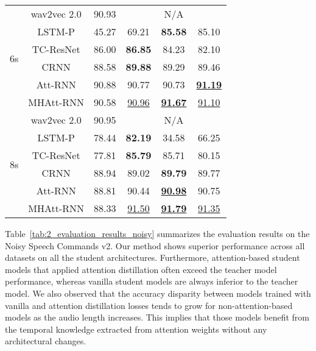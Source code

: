 \documentclass{article}
\begin{document}
\begin{table}[t]
\begin{tabular}{c|c|c|ccc}
\multirow{6}{*}{ 6s } & wav2vec 2.0 & 90.93 & \multicolumn{3}{c}{ N/A } \\
\cmidrule{2-6}
& LSTM-P & 45.27 & 69.21 & \textbf{ 85.58 } & 85.10 \\
& TC-ResNet & 86.00 & \textbf{ 86.85 } & 84.23 & 82.10 \\
& CRNN & 88.58 & \textbf{ 89.88 } & 89.29 & 89.46 \\
& Att-RNN & 90.88 & 90.77 & 90.73 & \textbf{ \underline{91.19} } \\
& MHAtt-RNN & 90.58 & \underline{90.96} & \textbf{ \underline{91.67} } & \underline{91.10} \\
\midrule

\multirow{6}{*}{ 8s } & wav2vec 2.0 & 90.95 & \multicolumn{3}{c}{ N/A } \\
\cmidrule{2-6}
& LSTM-P & 78.44 & \textbf{ 82.19 } & 34.58 & 66.25 \\
& TC-ResNet & 77.81 & \textbf{ 85.79 } & 85.71 & 80.15 \\
& CRNN & 88.94 & 89.02 & \textbf{ 89.79 } & 89.77 \\
& Att-RNN & 88.81 & 90.44 & \textbf{ \underline{90.98} } & 90.75 \\
& MHAtt-RNN & 88.33 & \underline{91.50} & \textbf{ \underline{91.79} } & \underline{91.35} \\
\bottomrule

\end{tabular}
\vspace{-1em}

\end{table} 
Table~\ref{tab:2_evaluation_results_noisy} summarizes the evaluation results on the Noisy Speech Commands v2.
Our method shows superior performance across all datasets on all the student architectures.
Furthermore, attention-based student models that applied attention distillation often exceed the teacher model performance, whereas vanilla student models are always inferior to the teacher model.
We also observed that the accuracy disparity between models trained with vanilla and attention distillation losses tends to grow for non-attention-based models as the audio length increases.
This implies that those models benefit from the temporal knowledge extracted from attention weights without any architectural changes.
\end{document}
